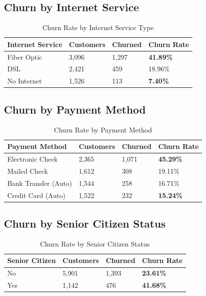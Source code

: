 \documentclass[11pt,a4paper]{article}
\begin{document}
\subsection{Churn by Internet Service}

\begin{table}[H]
\centering
\begin{tabular}{p{4cm} p{2.5cm} p{2.5cm} p{2.5cm}}
\toprule
\rowcolor{primary!10}
\textbf{Internet Service} & \textbf{Customers} & \textbf{Churned} & \textbf{Churn Rate} \\
\midrule
\rowcolor{churnred!15}
Fiber Optic & 3,096 & 1,297 & \textcolor{churnred}{\textbf{41.89\%}} \\
DSL & 2,421 & 459 & 18.96\% \\
\rowcolor{retentiongreen!15}
No Internet & 1,526 & 113 & \textcolor{retentiongreen}{\textbf{7.40\%}} \\
\bottomrule
\end{tabular}
\caption{Churn Rate by Internet Service Type}
\end{table}

\subsection{Churn by Payment Method}

\begin{table}[H]
\centering
\begin{tabular}{p{4.5cm} p{2.5cm} p{2.5cm} p{2.5cm}}
\toprule
\rowcolor{primary!10}
\textbf{Payment Method} & \textbf{Customers} & \textbf{Churned} & \textbf{Churn Rate} \\
\midrule
\rowcolor{churnred!15}
Electronic Check & 2,365 & 1,071 & \textcolor{churnred}{\textbf{45.29\%}} \\
Mailed Check & 1,612 & 308 & 19.11\% \\
Bank Transfer (Auto) & 1,544 & 258 & 16.71\% \\
\rowcolor{retentiongreen!15}
Credit Card (Auto) & 1,522 & 232 & \textcolor{retentiongreen}{\textbf{15.24\%}} \\
\bottomrule
\end{tabular}
\caption{Churn Rate by Payment Method}
\end{table}

\subsection{Churn by Senior Citizen Status}

\begin{table}[H]
\centering
\begin{tabular}{p{4cm} p{2.5cm} p{2.5cm} p{2.5cm}}
\toprule
\rowcolor{primary!10}
\textbf{Senior Citizen} & \textbf{Customers} & \textbf{Churned} & \textbf{Churn Rate} \\
\midrule
\rowcolor{retentiongreen!15}
No & 5,901 & 1,393 & \textcolor{retentiongreen}{\textbf{23.61\%}} \\
\rowcolor{churnred!15}
Yes & 1,142 & 476 & \textcolor{churnred}{\textbf{41.68\%}} \\
\bottomrule
\end{tabular}
\caption{Churn Rate by Senior Citizen Status}
\end{table}
\end{document}
